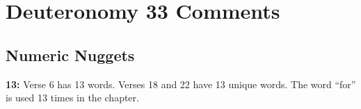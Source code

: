 \section{Deuteronomy 33 Comments}

\subsection{Numeric Nuggets}
\textbf{13: } Verse 6 has 13 words. Verses 18 and 22 have 13 unique words. The word ``for'' is used 13 times in the chapter.